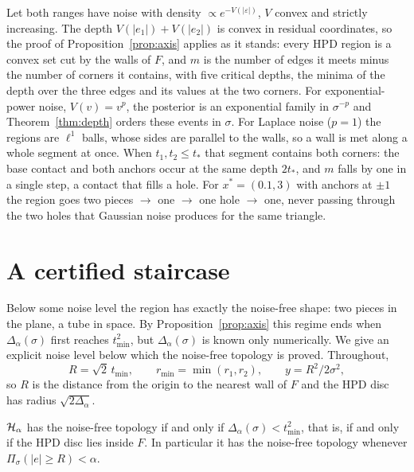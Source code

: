\begin{remark}\label{rem:noise2}
Let both ranges have noise with density $\propto e^{-V(|\varepsilon|)}$, $V$ convex and strictly increasing. The depth
$V(|e_1|) + V(|e_2|)$ is convex in residual coordinates, so the proof of Proposition~\ref{prop:axis} applies as it stands:
every HPD region is a convex set cut by the walls of $F$, and $m$ is the number of edges it meets minus the number of
corners it contains, with five critical depths, the minima of the depth over the three edges and its values at the two
corners. For exponential-power noise, $V(v) = v^p$, the posterior is an exponential family in $\sigma^{-p}$ and
Theorem~\ref{thm:depth} orders these events in $\sigma$. For Laplace noise ($p = 1$) the regions are $\ell^1$ balls,
whose sides are parallel to the walls, so a wall is met along a whole segment at once. When $t_1, t_2 \le t_*$ that
segment contains both corners: the base contact and both anchors occur at the same depth $2t_*$, and $m$ falls by one
in a single step, a contact that fills a hole. For $x^* = (0.1, 3)$ with anchors at $\pm1$ the region goes two pieces
$\to$ one $\to$ one hole $\to$ one, never passing through the two holes that Gaussian noise produces for the same
triangle.
\end{remark}

\section{A certified staircase}\label{sec:staircase}

Below some noise level the region has exactly the noise-free shape: two pieces in the plane, a tube in space. By
Proposition~\ref{prop:axis} this regime ends when $\Delta_\alpha(\sigma)$ first reaches $t_{\min}^2$, but
$\Delta_\alpha(\sigma)$ is known only numerically. We give an explicit noise level below which the noise-free topology
is proved. Throughout,
\[ R = \sqrt2\,t_{\min}, \qquad r_{\min} = \min(r_1, r_2), \qquad y = R^2/2\sigma^2 , \]
so $R$ is the distance from the origin to the nearest wall of $F$ and the HPD disc has radius $\sqrt{2\Delta_\alpha}$.

\begin{proposition}\label{prop:criterion}
$\mathcal{H}_\alpha$ has the noise-free topology if and only if $\Delta_\alpha(\sigma) < t_{\min}^2$, that is, if and only if the
HPD disc lies inside $F$. In particular it has the noise-free topology whenever $\Pi_\sigma(|e| \ge R) < \alpha$.
\end{proposition}

